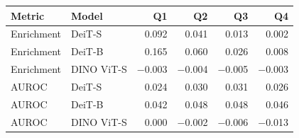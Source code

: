 \begin{tabular}{@{}llrrrr@{}}
\toprule
Metric & Model & Q1 & Q2 & Q3 & Q4 \\
\midrule
Enrichment & DeiT-S & 0.092 & 0.041 & 0.013 & 0.002 \\
Enrichment & DeiT-B & 0.165 & 0.060 & 0.026 & 0.008 \\
Enrichment & DINO ViT-S & $-$0.003 & $-$0.004 & $-$0.005 & $-$0.003 \\
AUROC & DeiT-S & 0.024 & 0.030 & 0.031 & 0.026 \\
AUROC & DeiT-B & 0.042 & 0.048 & 0.048 & 0.046 \\
AUROC & DINO ViT-S & 0.000 & $-$0.002 & $-$0.006 & $-$0.013 \\
\bottomrule
\end{tabular}
